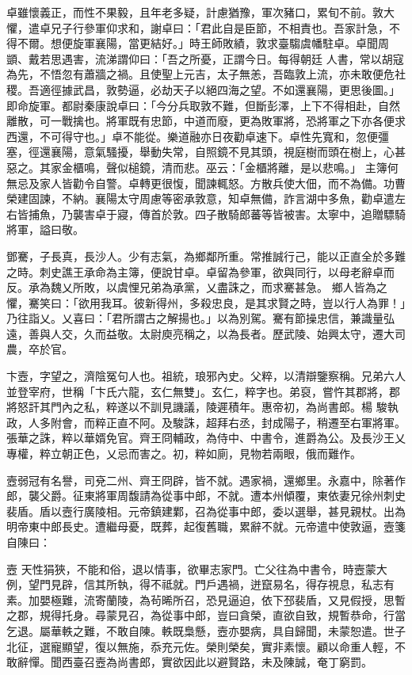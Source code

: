 \begin{pinyinscope}
 卓雖懷義正，而性不果毅，且年老多疑，計慮猶豫，軍次豬口，累旬不前。敦大懼，遣卓兄子行參軍仰求和，謝卓曰：「君此自是臣節，不相責也。吾家計急，不得不爾。想便旋軍襄陽，當更結好。」時王師敗績，敦求臺騶虞幡駐卓。卓聞周顗、戴若思遇害，流涕謂仰曰：「吾之所憂，正謂今日。每得朝廷
 人書，常以胡寇為先，不悟忽有蕭牆之禍。且使聖上元吉，太子無恙，吾臨敦上流，亦未敢便危社稷。吾適徑據武昌，敦勢逼，必劫天子以絕四海之望。不如還襄陽，更思後圖。」即命旋軍。都尉秦康說卓曰：「今分兵取敦不難，但斷彭澤，上下不得相赴，自然離散，可一戰擒也。將軍既有忠節，中道而廢，更為敗軍將，恐將軍之下亦各便求西還，不可得守也。」卓不能從。樂道融亦日夜勸卓速下。卓性先寬和，忽便彊塞，徑還襄陽，意氣騷擾，舉動失常，自照鏡不見其頭，視庭樹而頭在樹上，心甚惡之。其家金櫃鳴，聲似槌鏡，清而悲。巫云：「金櫃將離，是以悲鳴。」
 主簿何無忌及家人皆勸令自警。卓轉更很愎，聞諫輒怒。方散兵使大佃，而不為備。功曹榮建固諫，不納。襄陽太守周慮等密承敦意，知卓無備，詐言湖中多魚，勸卓遣左右皆捕魚，乃襲害卓于寢，傳首於敦。四子散騎郎蕃等皆被害。太寧中，追贈驃騎將軍，謚曰敬。



 鄧騫，子長真，長沙人。少有志氣，為鄉鄰所重。常推誠行己，能以正直全於多難之時。刺史譙王承命為主簿，便說甘卓。卓留為參軍，欲與同行，以母老辭卓而反。承為魏乂所敗，以虞悝兄弟為承黨，乂盡誅之，而求騫甚急。
 鄉人皆為之懼，騫笑曰：「欲用我耳。彼新得州，多殺忠良，是其求賢之時，豈以行人為罪！」乃往詣乂。乂喜曰：「君所謂古之解揚也。」以為別駕。騫有節操忠信，兼識量弘遠，善與人交，久而益敬。太尉庾亮稱之，以為長者。歷武陵、始興太守，遷大司農，卒於官。



 卞壼，字望之，濟陰冤句人也。祖統，琅邪內史。父粹，以清辯鑒察稱。兄弟六人並登宰府，世稱「卞氏六龍，玄仁無雙」。玄仁，粹字也。弟裒，嘗忤其郡將，郡將怒訐其門內之私，粹遂以不訓見譏議，陵遲積年。惠帝初，為尚書郎。楊
 駿執政，人多附會，而粹正直不阿。及駿誅，超拜右丞，封成陽子，稍遷至右軍將軍。張華之誅，粹以華婿免官。齊王冏輔政，為侍中、中書令，進爵為公。及長沙王乂專權，粹立朝正色，乂忌而害之。初，粹如廁，見物若兩眼，俄而難作。



 壼弱冠有名譽，司兗二州、齊王冏辟，皆不就。遇家禍，還鄉里。永嘉中，除著作郎，襲父爵。征東將軍周馥請為從事中郎，不就。遭本州傾覆，東依妻兄徐州刺史裴盾。盾以壼行廣陵相。元帝鎮建鄴，召為從事中郎，委以選舉，甚見親杖。出為明帝東中郎長史。遭繼母憂，既葬，起復舊職，累辭不就。元帝遣中使敦逼，壼箋自陳曰：



 壼
 天性狷狹，不能和俗，退以情事，欲畢志家門。亡父往為中書令，時壼蒙大例，望門見辟，信其所執，得不祗就。門戶遇禍，迸竄易名，得存視息，私志有素。加嬰極難，流寄蘭陵，為茍晞所召，恐見逼迫，依下邳裴盾，又見假授，思暫之郡，規得托身。尋蒙見召，為從事中郎，豈曰貪榮，直欲自致，規暫恭命，行當乞退。屬華軼之難，不敢自陳。軼既梟懸，壼亦嬰病，具自歸聞，未蒙恕遣。世子北征，選寵顯望，復以無施，忝充元佐。榮則榮矣，實非素懷。顧以命重人輕，不敢辭憚。聞西臺召壼為尚書郎，實欲因此以避賢路，未及陳誠，奄丁窮罰。




\end{pinyinscope}
